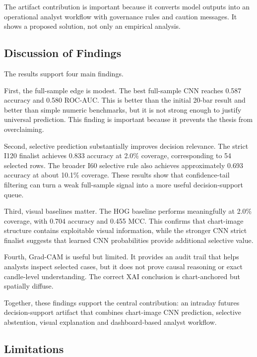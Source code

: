 The artifact contribution is important because it converts model outputs into an operational analyst workflow with governance rules and caution messages. It shows a proposed solution, not only an empirical analysis.

\subsection{Discussion of Findings}
\label{subsec:discussion}

The results support four main findings.

First, the full-sample edge is modest. The best full-sample CNN reaches 0.587 accuracy and 0.580 ROC-AUC. This is better than the initial 20-bar result and better than simple numeric benchmarks, but it is not strong enough to justify universal prediction. This finding is important because it prevents the thesis from overclaiming.

Second, selective prediction substantially improves decision relevance. The strict I120 finalist achieves 0.833 accuracy at 2.0\% coverage, corresponding to 54 selected rows. The broader I60 selective rule also achieves approximately 0.693 accuracy at about 10.1\% coverage. These results show that confidence-tail filtering can turn a weak full-sample signal into a more useful decision-support queue.

Third, visual baselines matter. The HOG baseline performs meaningfully at 2.0\% coverage, with 0.704 accuracy and 0.455 MCC. This confirms that chart-image structure contains exploitable visual information, while the stronger CNN strict finalist suggests that learned CNN probabilities provide additional selective value.

Fourth, Grad-CAM is useful but limited. It provides an audit trail that helps analysts inspect selected cases, but it does not prove causal reasoning or exact candle-level understanding. The correct XAI conclusion is chart-anchored but spatially diffuse.

Together, these findings support the central contribution: an intraday futures decision-support artifact that combines chart-image CNN prediction, selective abstention, visual explanation and dashboard-based analyst workflow.

\subsection{Limitations}
\label{subsec:limitations}




